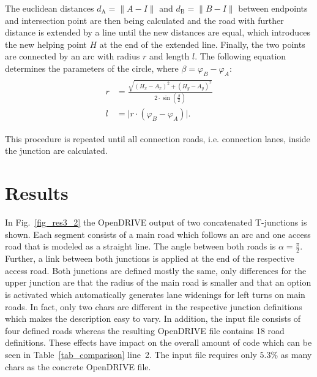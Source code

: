 \documentclass[a4paper, 10pt, conference]{ieeeconf}      %
\begin{document}
    The euclidean distances $d_\text{A} = \|A-I\|$ and $d_\text{B} = \|B-I\|$ between endpoints and intersection point are then being calculated and the road with further distance is extended by a line until the new distances are equal, which introduces the new helping point \(H\) at the end of the extended line. Finally, the two points are connected by an arc with radius \(r\) and length \(l\). The following equation determines the parameters of the circle, where \(\beta = \varphi_B - \varphi_A\):
    \begin{align}
        \begin{split}           
        r &= \frac{\sqrt{\left(H_x - A_x\right)^2 + \left(H_y - A_y\right)^2}}{2 \cdot \sin\left(\frac{\beta}{2}\right)} \\
        l &= \vert r \cdot \left(\varphi_B - \varphi_A\right) \vert \text{.}  
        \end{split}
    \end{align}
    
    This procedure is repeated until all connection roads, i.e. connection lanes, inside the junction are calculated.
   
\section{Results}
In Fig.~\ref{fig_res3_2} the OpenDRIVE output of two concatenated T-junctions is shown. Each segment consists of a main road which follows an arc and one access road that is modeled as a straight line. The angle between both roads is $\alpha=\frac{\pi}{2}$. Further, a link between both junctions is applied at the end of the respective access road. Both junctions are defined mostly the same, only differences for the upper junction are that the radius of the main road is smaller and that an option is activated which automatically generates lane widenings for left turns on main roads. In fact, only two chars are different in the respective junction definitions which makes the description easy to vary. In addition, the input file consists of four defined roads whereas the resulting OpenDRIVE file contains 18 road definitions. These effects have impact on the overall amount of code which can be seen in Table~\ref{tab_comparison} line~2. The input file requires only $5.3\%$ as many chars as the concrete OpenDRIVE file.
\end{document}
